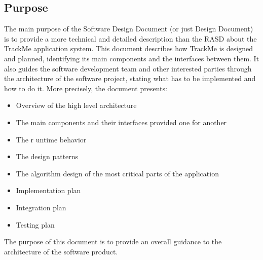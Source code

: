\documentclass[12pt]{article}
\begin{document}
\subsection{Purpose}
The main purpose of the Software Design Document (or just Design Document) is to provide a more technical and detailed description than the RASD about the TrackMe application system. This document describes how TrackMe is designed and planned, identifying its main components and the interfaces between them. It also guides the software development team and other interested parties through the architecture of the software project, stating what has to be implemented and how to do it.
\vspace{3mm}
\newline 
More precisely, the document presents:
\begin{itemize}
    \item Overview of the high level architecture
    \item The main components and their interfaces provided one for another
    \item The r untime behavior
    \item The design patterns
    \item The algorithm design of the most critical parts of the application
    \item Implementation plan
    \item Integration plan
    \item Testing plan
\end{itemize}
The purpose of this document is to provide an overall guidance to the architecture of the software product.
\end{document}
